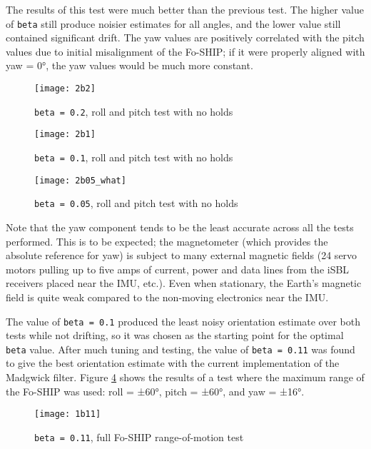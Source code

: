 \documentclass[11pt]{ucthesisCP}
\begin{document}
The results of this test were much better than the previous test. The higher value of \verb|beta| still produce noisier estimates for all angles, and the lower value still contained significant drift. The yaw values are positively correlated with the pitch values due to initial misalignment of the Fo-SHIP; if it were properly aligned with yaw = 0°, the yaw values would be much more constant.

\begin{figure}[htbp]
\centering
\texttt{[image: 2b2]}
\caption{\texttt{beta = 0.2}, roll and pitch test with no holds}
\label{fig:2b2}
\end{figure}

\begin{figure}[htbp]
\centering
\texttt{[image: 2b1]}
\caption{\texttt{beta = 0.1}, roll and pitch test with no holds}
\label{fig:2b1}
\end{figure}

\begin{figure}[htbp]
\centering
\texttt{[image: 2b05\_what]}
\caption{\texttt{beta = 0.05}, roll and pitch test with no holds}
\label{fig:2b05}
\end{figure}

Note that the yaw component tends to be the least accurate across all the tests performed. This is to be expected; the magnetometer (which provides the absolute reference for yaw) is subject to many external magnetic fields (24 servo motors pulling up to five amps of current, power and data lines from the iSBL receivers placed near the IMU, etc.). Even when stationary, the Earth’s magnetic field is quite weak compared to the non-moving electronics near the IMU.

The value of \verb|beta = 0.1| produced the least noisy orientation estimate over both tests while not drifting, so it was chosen as the starting point for the optimal \verb|beta| value. After much tuning and testing, the value of \verb|beta = 0.11| was found to give the best orientation estimate with the current implementation of the Madgwick filter. Figure \ref{fig:1b11} shows the results of a test where the maximum range of the Fo-SHIP was used: roll = ±60°, pitch = ±60°, and yaw = ±16°.

\begin{figure}[htbp]
\centering
\texttt{[image: 1b11]}
\caption{\texttt{beta = 0.11}, full Fo-SHIP range-of-motion test}
\label{fig:1b11}
\end{figure}
\end{document}
